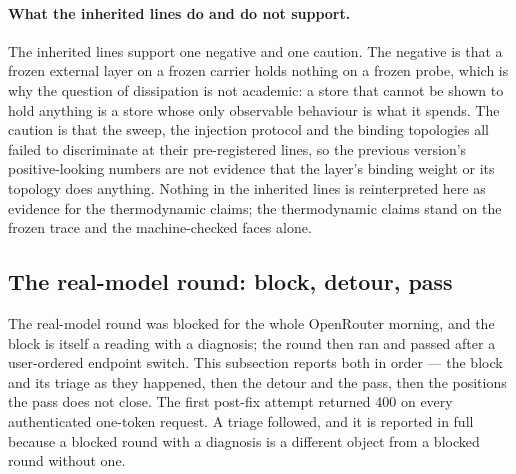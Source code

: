 \documentclass[11pt,a4paper]{article}
\begin{document}
\paragraph{What the inherited lines do and do not support.}
The inherited lines support one negative and one caution. The negative is that a frozen external layer on a frozen carrier holds nothing on a frozen probe, which is why the question of dissipation is not academic: a store that cannot be shown to hold anything is a store whose only observable behaviour is what it spends. The caution is that the sweep, the injection protocol and the binding topologies all failed to discriminate at their pre-registered lines, so the previous version's positive-looking numbers are not evidence that the layer's binding weight or its topology does anything. Nothing in the inherited lines is reinterpreted here as evidence for the thermodynamic claims; the thermodynamic claims stand on the frozen trace and the machine-checked faces alone.

\subsection{The real-model round: block, detour, pass}
\label{sec:blocked}
The real-model round was blocked for the whole OpenRouter morning, and the block is itself a reading with a diagnosis; the round then ran and passed after a user-ordered endpoint switch. This subsection reports both in order --- the block and its triage as they happened, then the detour and the pass, then the positions the pass does not close. The first post-fix attempt returned 400 on every authenticated one-token request. A triage followed, and it is reported in full because a blocked round with a diagnosis is a different object from a blocked round without one.
\end{document}
